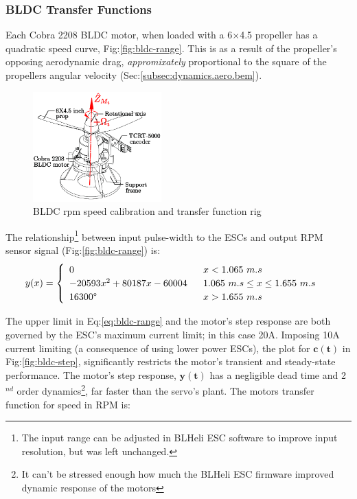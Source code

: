 \subsubsection*{BLDC Transfer Functions}
Each Cobra 2208 BLDC motor, when loaded with a 6$\times$4.5 propeller has a quadratic speed curve, Fig:\ref{fig:bldc-range}. This is as a result of the propeller's opposing aerodynamic drag, \emph{appromixately} proportional to the square of the propellers angular velocity (Sec:\ref{subsec:dynamics.aero.bem}). 
\par
\begin{figure}[htb]
\vspace{-15pt}
\centering
\includegraphics[width=0.44\textwidth]{figs/bldc-rpm}
\caption{BLDC rpm speed calibration and transfer function rig}
\label{fig:bldc-rpm}
\vspace{-15pt}
\end{figure}
The relationship\footnote{The input range can be adjusted in BLHeli ESC software to improve input resolution, but was left unchanged.} between input pulse-width to the ESCs and output RPM sensor signal (Fig:\ref{fig:bldc-range}) is:
\begin{equation}
y(x)=
\begin{cases}\begin{array}{ll}
0 & ~~x<1.065~m.s\\
-20593x^2 + 80187x - 60004 & ~~1.065~m.s \leq x \leq 1.655~m.s\\
16300\text{\textdegree} & ~~x>1.655~m.s\\
\end{array}
\end{cases}
\label{eq:bldc-range}
\end{equation}
\par
The upper limit in Eq:\ref{eq:bldc-range} and the motor's step response are both governed by the ESC's maximum current limit; in this case 20A. Imposing 10A current limiting (a consequence of using lower power ESCs), the plot for {\color{YellowGreen}$\mathbf{c(t)}$} in Fig:\ref{fig:bldc-step}, significantly restricts the motor's transient and steady-state performance. The motor's step response, {\color{Purple}$\mathbf{y(t)}$} has a negligible dead time and 2$^{nd}$ order dynamics\footnote{It can't be stressed enough how much the BLHeli ESC firmware improved dynamic response of the motors}, far faster than the servo's plant. The motors transfer function for speed in RPM is:
